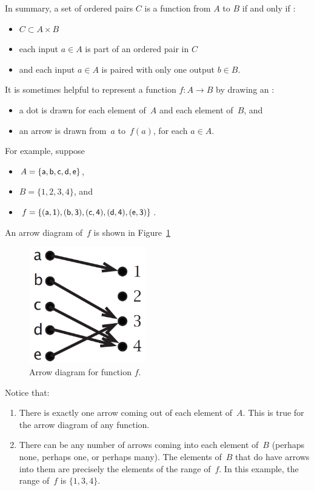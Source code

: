 In summary, a set of ordered pairs $C$ is a function from $A$ to $B$ if and only if :
\begin{itemize}
\item
$C \subset A \times B$
\item
each input $a \in A$ is part of an ordered pair in $C$
\item
and each input $a \in A$ is paired with only one output $b \in B$.
\end{itemize}

It is sometimes helpful to represent a function $f \colon A \to B$ by drawing an : 
\begin{itemize}
\item a dot is drawn for each element of~$A$ and each element of~$B$,
and
\item an arrow is drawn from~$a$ to~$f(a)$, for each $a \in A$.
\end{itemize}
For example, suppose 
\begin{itemize}
\item $A = \{\sf{a}, \sf{b}, \sf{c}, \sf{d}, \sf{e}\}$,
\item $B = \{1, 2, 3, 4\}$,
and
\item $f = \{ (\sf{a},1), (\sf{b}, 3), (\sf{c}, 4), (\sf{d},4), (\sf{e}, 3) \}$.
\end{itemize}
An arrow diagram of~$f$ is shown in Figure~\ref{fig:arrowDiag}
\begin{figure}[h]
\begin{center}
\includegraphics[width = 2in]{images/arrowdiageg.png}
\caption{Arrow diagram for function $f$.}
\label{fig:arrowDiag}
\end{center}
\end{figure}
Notice that:
\begin{enumerate}
\item There is exactly one arrow coming out of each element of~$A$. This is true for the arrow diagram of any function.
\item There can be any number of arrows coming into each element of~$B$ (perhaps none, perhaps one, or perhaps many). The elements of~$B$ that do have arrows into them are precisely the elements of the range of~$f$. In this example, the range of~$f$ is $\{1,3,4\}$.
\end{enumerate}


